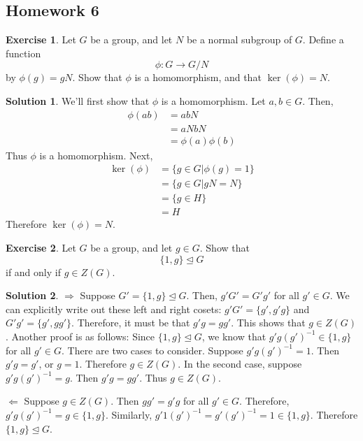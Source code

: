 \documentclass[12pt]{article}
\theoremstyle{definition}
\newtheorem{exercise}{\color{YellowOrange}Exercise}
\theoremstyle{definition}
\newtheorem{solution}{\color{Goldenrod}Solution}
\begin{document}
\subsection{Homework 6}
\begin{exercise}
	Let $G$ be a group, and let $N$ be a normal subgroup of $G$. Define a function 
	\begin{equation}
		\phi : G \to G / N
	\end{equation}
	by $\phi(g) = gN$. Show that $\phi$ is a homomorphism, and that $\ker(\phi) = N$.
\end{exercise}
\begin{solution}
	We'll first show that $\phi$ is a homomorphism. Let $a,b \in G$. Then,
	\begin{align*}
	\phi(ab) &= abN \\
	&= aNbN \tag{definition of multiplication on quotient groups} \\
	&= \phi(a)\phi(b) 
	\end{align*}
	Thus $\phi$ is a homomorphism. Next,
	\begin{align*}
	\ker(\phi) &= \{ g \in G | \phi(g) = 1 \} \\
	&= \{ g \in G | gN = N \} \\
	&= \{ g \in H \} \\
	&= H
	\end{align*}
	Therefore $\ker(\phi) = N$. 
\end{solution}

\begin{exercise}
	Let $G$ be a group, and let $g \in G$. Show that 
	\begin{equation}
		\{1, g\} \trianglelefteq G
	\end{equation}
	if and only if $g \in Z(G)$. 
\end{exercise}
\begin{solution}
	$\Rightarrow$ Suppose $G' = \{1, g\} \trianglelefteq G$. Then, $g'G' = G'g'$ for all $g' \in G$. We can explicitly write out these left and right cosets: $g'G' = \{g', g'g \}$ and $G'g' = \{g', gg'\}$. Therefore, it must be that $g'g = gg'$. This shows that $g \in Z(G)$. Another proof is as follows: Since $\{1, g\} \trianglelefteq G$, we know that $g'g(g')^{-1} \in \{1, g\}$ for all $g' \in G$. There are two cases to consider. Suppose $g' g (g')^{-1} = 1$. Then $g'g = g'$, or $g = 1$. Therefore $g \in Z(G)$. In the second case, suppose $g' g (g')^{-1} = g$. Then $g'g = gg'$. Thus $g \in Z(G)$. 

	$\Leftarrow$ Suppose $g \in Z(G)$. Then $gg' = g'g$ for all $g' \in G$. Therefore, $g'g(g')^{-1} = g \in \{1, g\}$. Similarly, $g'1(g')^{-1} = g'(g')^{-1} = 1 \in \{1, g\}$. Therefore $\{1, g\} \trianglelefteq G$.
\end{solution}
\end{document}
